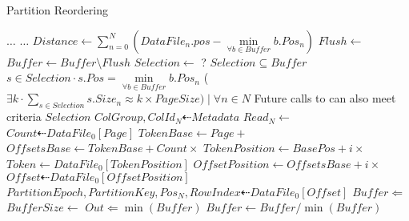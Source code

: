 \documentclass[fleqn]{article}
\begin{document}
\begin{algorithm}
\scriptsize
\caption{Partition Reordering}
\begin{algorithmic}[1]
\State $\dots$
\Statex
{} 
 \State $\dots$
 \State $Distance \gets \sum\limits_{n=0}^{N} (DataFile_{n}.pos - \min\limits_{\forall b \in Buffer} b.Pos_{n}) $
   \State $Flush \gets$ 
   \State {}
   \State $Buffer \gets Buffer \setminus Flush$
 \EndIf
\EndFor
\EndProcedure
\Statex
{}
\State $Selection \gets$ ?
\Ensure $Selection \subseteq Buffer$
\Ensure $s \in Selection \cdot s.Pos = \min\limits_{\forall b \in Buffer} b.Pos_{n}$
\Ensure ($\exists k \cdot \sum\limits_{s \in Selection} s.Size_{n} \approx k \times PageSize) \mid \forall n \in N $
\Ensure Future calls to  can also meet criteria
\State \Return $Selection$
\EndFunction
\Statex
{}
\State $ColGroup, ColId_N \dashleftarrow Metadata$
\State $Read_N \gets $ 
 \State $Count \dashleftarrow DataFile_{0}[Page]$
 \State $TokenBase \gets Page +  $ 
 \State $OffsetsBase \gets TokenBase + Count \times $
  \State $TokenPosition \gets BasePos + i \times $ 
  \State $Token \gets DataFile_0[TokenPosition]$
   \State $OffsetPosition \gets OffsetsBase + i \times $ 
   \State $Offset \dashleftarrow DataFile_{0}[OffsetPosition]$
   \State $PartitionEpoch, PartitionKey, Pos_N, RowIndex \dashleftarrow DataFile_{0}[Offset]$
   \State $Buffer \Leftarrow $ 
   \State $BufferSize \gets $ 
    \State $Out \Leftarrow \min(Buffer)$
    \State $Buffer \gets Buffer / {\min(Buffer)}$
   \EndIf
  \EndIf
 \EndFor
\EndFor
\EndProcedure
\end{algorithmic}
\end{algorithm}

\clearpage
\end{document}
